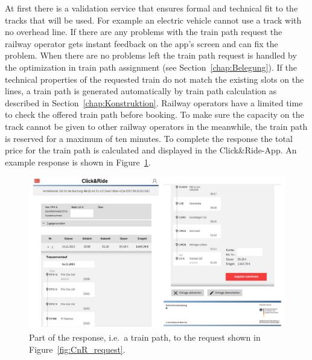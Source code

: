 At first there is a validation service that ensures formal and technical fit to the tracks that will be used. For example an electric vehicle cannot use a track with no overhead line. If there are any problems with the train path request the railway operator gets instant feedback on the app's screen and can fix the problem. When there are no problems left the train path request is handled by the optimization in train path assignment (see Section~\ref{chap:Belegung}). If the technical properties of the requested train do not match the existing slots on the lines, a train path is generated automatically by train path calculation as described in Section~\ref{chap:Konstruktion}. Railway operators have a limited time to check the offered train path before booking. To make sure the capacity on the track cannot be given to other railway operators in the meanwhile, the train path is reserved for a maximum of ten minutes. To complete the response the total price for the train path is calculated and displayed in the Click\&Ride-App. An example response is shown in Figure~\ref{fig:CnR_response}.
\begin{figure}[htb]
	\centering
	\includegraphics[width=\textwidth]{Bilder/response.jpg}
	\caption{Part of the response, i.e.\ a train path, to the request shown in Figure~\ref{fig:CnR_request}.}
	\label{fig:CnR_response}
\end{figure}

